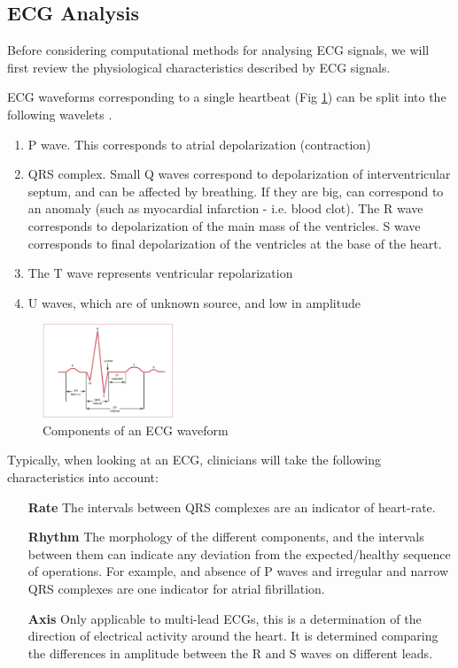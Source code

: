 \documentclass[9pt,conference]{IEEEtran}
\begin{document}
\subsection{ECG Analysis}
Before considering computational methods for analysing ECG signals, we will first review the physiological characteristics described by ECG signals.

ECG waveforms corresponding to a single heartbeat (Fig \ref{fig:ecg_components}) can be split into the following wavelets \cite{cardioBook}.

\begin{enumerate}
    \item P wave. This corresponds to atrial depolarization (contraction) 
    \item QRS complex. Small Q waves correspond to depolarization of interventricular septum, and can be affected by breathing. If they are big, can correspond to an anomaly (such as myocardial infarction - i.e. blood clot). The R wave corresponds to depolarization of the main mass of the ventricles. S wave corresponds to final depolarization of the ventricles at the base of the heart.
    \item The T wave represents ventricular repolarization
    \item U waves, which are of unknown source, and low in amplitude
\end{enumerate}

\begin{figure}[H]
\centering\includegraphics[width = 0.35\textwidth]{ecg_components.jpg}
\caption{\label{fig:ecg_components} Components of an ECG waveform}
\end{figure}

Typically, when looking at an ECG, clinicians will take the following characteristics into account:

\begin{enumerate}
    \item[\textbf{Rate}] The intervals between QRS complexes are an indicator of heart-rate.
    \item[\textbf{Rhythm}] The morphology of the different components, and the intervals between them can indicate any deviation from the expected/healthy sequence of operations. For example, and absence of P waves and irregular and narrow QRS complexes are one indicator for atrial fibrillation.
    \item[\textbf{Axis}] Only applicable to multi-lead ECGs, this is a determination of the direction of electrical activity around the heart. It is determined comparing the differences in amplitude between the R and S waves on different leads.
\end{enumerate}
\end{document}
